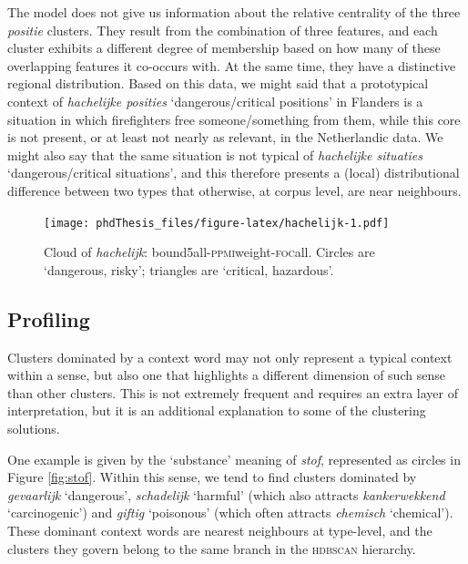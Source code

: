 \documentclass[
]{book}
\begin{document}
The model does not give us information about the relative centrality of the three \emph{positie} clusters. They result from the combination of three features, and each cluster exhibits a different degree of membership based on how many of these overlapping features it co-occurs with. At the same time, they have a distinctive regional distribution. Based on this data, we might said that a prototypical context of \emph{hachelijke posities} `dangerous/critical positions' in Flanders is a situation in which firefighters free someone/something from them, while this core is not present, or at least not nearly as relevant, in the Netherlandic data. We might also say that the same situation is not typical of \emph{hachelijke situaties} `dangerous/critical situations', and this therefore presents a (local) distributional difference between two types that otherwise, at corpus level, are near neighbours.



\begin{figure}
\centering
\texttt{[image: phdThesis\_files/figure-latex/hachelijk-1.pdf]}
\caption{\label{fig:hachelijk}Cloud of \emph{hachelijk}: bound5all-\textsc{ppmi}weight-\textsc{foc}all. Circles are `dangerous, risky'; triangles are `critical, hazardous'.}
\end{figure}

\hypertarget{stof}{%
\subsection{Profiling}\label{stof}}

Clusters dominated by a context word may not only represent a typical context within a sense, but also one that highlights a different dimension of such sense than other clusters. This is not extremely frequent and requires an extra layer of interpretation, but it is an additional explanation to some of the clustering solutions.

One example is given by the `substance' meaning of \emph{stof}, represented as circles in Figure \ref{fig:stof}.
Within this sense, we tend to find clusters dominated by \emph{gevaarlijk} `dangerous', \emph{schadelijk} `harmful' (which also attracts \emph{kankerwekkend} `carcinogenic') and \emph{giftig} `poisonous' (which often attracts \emph{chemisch} `chemical'). These dominant context words are nearest neighbours at type-level, and the clusters they govern belong to the same branch in the \textsc{hdbscan} hierarchy.
\end{document}
